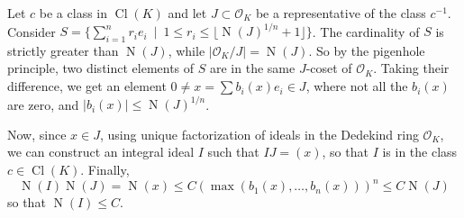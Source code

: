 \documentclass[12pt]{article}
\newcommand{\Alg}{\mathcal{O}}
\DeclareMathOperator{\N}{N}
\DeclareMathOperator{\Cl}{Cl}
\begin{document}
Let $c$ be a class in $\Cl(K)$ and let $J\subset \Alg_K$ be a representative of the class $c^{-1}$. Consider $S=\{\sum_{i=1}^n r_ie_i\ \mid\  1\leq r_i\leq \lfloor \N(J)^{1/n}+1\rfloor\}$. The cardinality of $S$ is strictly greater than $\N(J)$, while $\lvert\Alg_K/J\rvert=\N(J)$. So by the pigenhole principle, two distinct elements of $S$ are in the same $J$-coset of $\Alg_K$. Taking their difference, we get an element $0\neq x=\sum b_i(x)e_i\in J$, where not all the $b_i(x)$ are zero, and $\lvert b_i(x)\rvert \leq \N(J)^{1/n}$. 

Now, since $x\in J$, using unique factorization of ideals in the Dedekind ring $\Alg_K$, we can construct an integral ideal $I$ such that $IJ = (x)$, so that $I$ is in the class $c\in\Cl(K)$. Finally,
\[\N(I)\N(J) = \N(x)\leq C(\max(b_1(x),\ldots,b_n(x)))^n \leq C\N(J)\]
so that $\N(I)\leq C$.
\end{document}
